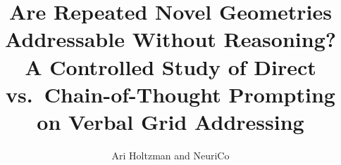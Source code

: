 \documentclass{article}
\title{Are Repeated Novel Geometries Addressable Without Reasoning?
A Controlled Study of Direct vs.\ Chain-of-Thought Prompting on
Verbal Grid Addressing}
\author{Ari Holtzman and NeuriCo}
\begin{document}
\maketitle

\begin{abstract}

\end{abstract}









\end{document}
